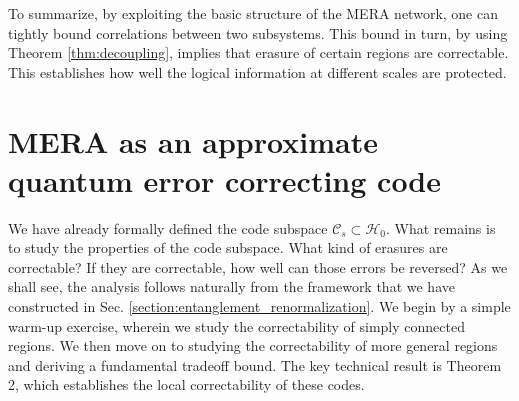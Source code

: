 \documentclass[a4paper,11pt]{article}
\newcommand{\1}{\mathbbm{1}}
\newcommand{\cH}{\mathcal{H}}
\newcommand{\cC}{\mathcal{C}}
\newcommand{\mjk}[1]{{\color{green} #1}}
\begin{document}
To summarize, by exploiting the basic structure of the MERA network, one can tightly bound correlations between two subsystems. This bound in turn, by using Theorem \ref{thm:decoupling}, implies
that erasure of certain regions are correctable. This establishes how well the logical information at different scales are protected.


\section{MERA as an approximate quantum error correcting code\label{section:mera_qec}}

We have already formally defined the code subspace $\cC_s \subset \mathcal{H}_0$. What remains is to study the properties of the code subspace. What
kind of erasures are correctable? If they are correctable, how well can those errors be reversed? As we shall see, the analysis follows naturally from the framework that we have constructed in Sec. \ref{section:entanglement_renormalization}.
We begin by a simple warm-up exercise, wherein we study the correctability of simply connected regions. We then move on to studying the correctability of more general regions and deriving a
fundamental tradeoff bound. The key technical result is Theorem 2, which establishes the local correctability of these codes.

\end{document}
